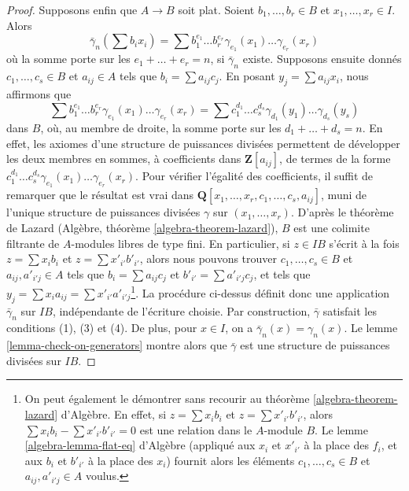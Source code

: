 \begin{proof}
\medskip\noindent
Supposons enfin que $A \to B$ soit plat. Soient $b_1, \ldots, b_r \in B$ et
$x_1, \ldots, x_r \in I$. Alors
$$
\bar\gamma_n(\sum b_ix_i) =
\sum b_1^{e_1} \ldots b_r^{e_r} \gamma_{e_1}(x_1) \ldots\gamma_{e_r}(x_r)
$$
où la somme porte sur les $e_1 + \ldots + e_r = n$,
si $\bar\gamma_n$ existe. Supposons ensuite donnés $c_1, \ldots, c_s \in B$
et $a_{ij} \in A$ tels que $b_i = \sum a_{ij}c_j$.
En posant $y_j = \sum a_{ij}x_i$, nous affirmons que
$$
\sum b_1^{e_1} \ldots b_r^{e_r} \gamma_{e_1}(x_1) \ldots\gamma_{e_r}(x_r) =
\sum c_1^{d_1} \ldots c_s^{d_s} \gamma_{d_1}(y_1) \ldots\gamma_{d_s}(y_s)
$$
dans $B$, où, au membre de droite, la somme porte sur les
$d_1 + \ldots + d_s = n$. En effet, les axiomes d'une structure de puissances
divisées permettent de développer les deux membres en sommes, à coefficients
dans $\mathbf{Z}[a_{ij}]$, de termes de la forme
$c_1^{d_1} \ldots c_s^{d_s}\gamma_{e_1}(x_1) \ldots\gamma_{e_r}(x_r)$.
Pour vérifier l'égalité des coefficients, il suffit de remarquer que le résultat est vrai
dans $\mathbf{Q}[x_1, \ldots, x_r, c_1, \ldots, c_s, a_{ij}]$, muni de l'unique structure de puissances divisées
$\gamma$ sur $(x_1, \ldots, x_r)$.
D'après le théorème de Lazard (Algèbre, théorème \ref{algebra-theorem-lazard}),
$B$ est une colimite filtrante de $A$-modules libres
de type fini. En particulier, si $z \in IB$ s'écrit à la fois $z = \sum x_ib_i$ et
$z = \sum x'_{i'}b'_{i'}$, alors nous pouvons trouver $c_1, \ldots, c_s \in B$
et $a_{ij}, a'_{i'j} \in A$ tels que $b_i = \sum a_{ij}c_j$
et $b'_{i'} = \sum a'_{i'j}c_j$, et tels que
$y_j = \sum x_ia_{ij} = \sum x'_{i'}a'_{i'j}$\footnote{On
peut également le démontrer sans
recourir au théorème \ref{algebra-theorem-lazard} d'Algèbre. En effet, si
$z = \sum x_ib_i$ et $z = \sum x'_{i'}b'_{i'}$, alors
$\sum x_ib_i - \sum x'_{i'}b'_{i'} = 0$ est une relation dans le
$A$-module $B$. Le lemme \ref{algebra-lemma-flat-eq}
d'Algèbre (appliqué aux $x_i$ et $x'_{i'}$ à la place des $f_i$,
et aux $b_i$ et $b'_{i'}$ à la place des $x_i$)
fournit alors les éléments $c_1, \ldots, c_s \in B$
et $a_{ij}, a'_{i'j} \in A$ voulus.}. La
procédure ci-dessus définit donc une application $\bar\gamma_n$
sur $IB$, indépendante de l'écriture choisie. Par construction, $\bar\gamma$ satisfait les conditions (1), (3)
et (4). De plus, pour $x \in I$, on a $\bar\gamma_n(x) = \gamma_n(x)$.
Le lemme \ref{lemma-check-on-generators} montre alors que $\bar\gamma$
est une structure de puissances divisées sur $IB$.
\end{proof}

